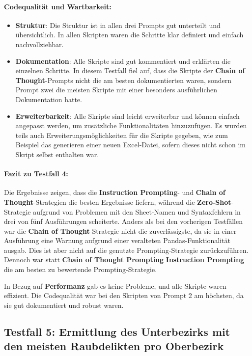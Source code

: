 \documentclass[11pt,a4paper]{article}
\begin{document}
\paragraph{Codequalität und Wartbarkeit:}
\begin{itemize}
    \item \textbf{Struktur}: Die Struktur ist in allen drei Prompts gut unterteilt und übersichtlich. In allen Skripten waren die Schritte klar definiert und einfach nachvollziehbar.
    \item \textbf{Dokumentation}: Alle Skripte sind gut kommentiert und erklärten die einzelnen Schritte. In diesem Testfall fiel auf, dass die Skripte der \textbf{Chain of Thought}-Prompts nicht die am besten dokumentierten waren, sondern Prompt zwei die meisten Skripte mit einer besonders ausführlichen Dokumentation hatte.
    \item \textbf{Erweiterbarkeit}: Alle Skripte sind leicht erweiterbar und können einfach angepasst werden, um zusätzliche Funktionalitäten hinzuzufügen. Es wurden teils auch Erweiterungsmöglichkeiten für die Skripte gegeben, wie zum Beispiel das generieren einer neuen Excel-Datei, sofern dieses nicht schon im Skript selbst enthalten war. 
\end{itemize}

\paragraph{Fazit zu Testfall 4:}
Die Ergebnisse zeigen, dass die \textbf{Instruction Prompting}- und \textbf{Chain of Thought}-Strategien die besten Ergebnisse liefern, während die \textbf{Zero-Shot}-Strategie aufgrund von Problemen mit den Sheet-Namen und Syntaxfehlern in drei von fünf Ausführungen scheiterte. Anders als bei den vorherigen Testfällen war die \textbf{Chain of Thought}-Strategie nicht die zuverlässigste, da sie in einer Ausführung eine Warnung aufgrund einer veralteten Pandas-Funktionalität ausgab. Dies ist aber nicht auf die genutzte Prompting-Strategie zurückzuführen. Dennoch war statt \textbf{Chain of Thought Prompting} \textbf{Instruction Prompting} die am besten zu bewertende Prompting-Strategie.

In Bezug auf \textbf{Performanz} gab es keine Probleme, und alle Skripte waren effizient. Die Codequalität war bei den Skripten von Prompt 2 am höchsten, da sie gut dokumentiert und robust waren.

\subsection{Testfall 5: Ermittlung des Unterbezirks mit den meisten Raubdelikten pro Oberbezirk}
\end{document}
